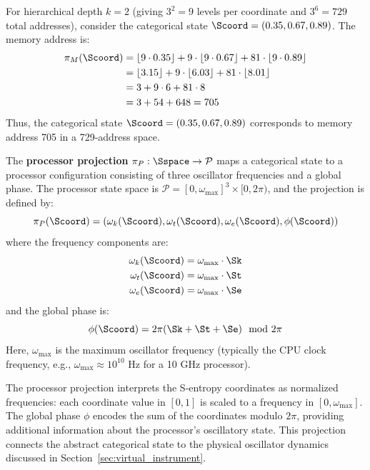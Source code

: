 \begin{example}
\label{ex:memory_address}
For hierarchical depth $k = 2$ (giving $3^2 = 9$ levels per coordinate and $3^6 = 729$ total addresses), consider the categorical state $\Scoord = (0.35, 0.67, 0.89)$. The memory address is:
\begin{align}
\pi_M(\Scoord) &= \lfloor 9 \cdot 0.35 \rfloor + 9 \cdot \lfloor 9 \cdot 0.67 \rfloor + 81 \cdot \lfloor 9 \cdot 0.89 \rfloor \\
&= \lfloor 3.15 \rfloor + 9 \cdot \lfloor 6.03 \rfloor + 81 \cdot \lfloor 8.01 \rfloor \\
&= 3 + 9 \cdot 6 + 81 \cdot 8 \\
&= 3 + 54 + 648 = 705
\end{align}
Thus, the categorical state $\Scoord = (0.35, 0.67, 0.89)$ corresponds to memory address 705 in a 729-address space.
\end{example}

\begin{definition}
\label{def:processor_projection}
The \textbf{processor projection} $\pi_P: \Sspace \to \mathcal{P}$ maps a categorical state to a processor configuration consisting of three oscillator frequencies and a global phase. The processor state space is $\mathcal{P} = [0, \omega_{\max}]^3 \times [0, 2\pi)$, and the projection is defined by:
\begin{equation}
\pi_P(\Scoord) = \left( \omega_k(\Scoord), \omega_t(\Scoord), \omega_e(\Scoord), \phi(\Scoord) \right)
\label{eq:processor_projection}
\end{equation}
where the frequency components are:
\begin{align}
\omega_k(\Scoord) &= \omega_{\max} \cdot \Sk \label{eq:omega_k} \\
\omega_t(\Scoord) &= \omega_{\max} \cdot \St \label{eq:omega_t} \\
\omega_e(\Scoord) &= \omega_{\max} \cdot \Se \label{eq:omega_e}
\end{align}
and the global phase is:
\begin{equation}
\phi(\Scoord) = 2\pi(\Sk + \St + \Se) \mod 2\pi
\label{eq:global_phase}
\end{equation}
Here, $\omega_{\max}$ is the maximum oscillator frequency (typically the CPU clock frequency, e.g., $\omega_{\max} \approx 10^{10}$ Hz for a 10 GHz processor).
\end{definition}

The processor projection interprets the S-entropy coordinates as normalized frequencies: each coordinate value in $[0,1]$ is scaled to a frequency in $[0, \omega_{\max}]$. The global phase $\phi$ encodes the sum of the coordinates modulo $2\pi$, providing additional information about the processor's oscillatory state. This projection connects the abstract categorical state to the physical oscillator dynamics discussed in Section~\ref{sec:virtual_instrument}.

